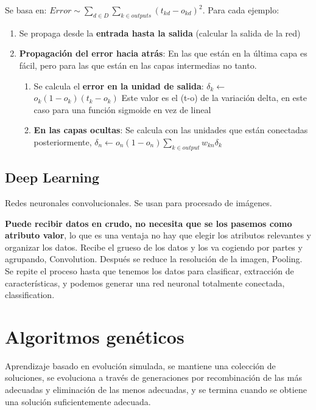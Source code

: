 \documentclass[12pt, twoside, openright]{report} %
\begin{document}
Se basa en:
$Error \sim \sum _{d \in D} \sum_{k \in outputs} (t_{kd}-o_{kd})^2$.
Para cada ejemplo:

\begin{enumerate}
	\def\labelenumi{\arabic{enumi}.}
	\item Se propaga desde la \textbf{entrada hasta la salida} (calcular la salida de la red)
	\pagebreak
	\item \textbf{Propagación del error hacia atrás}: En las que están en la
	      última capa es fácil, pero para las que están en las capas intermedias
	      no tanto.

	      \begin{enumerate}
		      \def\labelenumii{\arabic{enumii}.}
		      \item Se calcula el \textbf{error en la unidad de salida}:
		            \(\delta_k \leftarrow\) \(o_k(1-o_k)(t_k-o_k)\) Este valor es el
		            (t-o) de la variación delta, en este caso para una función sigmoide
		            en vez de lineal
		      \item \textbf{En las capas ocultas}: Se calcula con las unidades que están
		            conectadas posteriormente,
		            \(\delta_n \leftarrow o_n(1-o_n)\sum_{k \in output} w_{kn}\delta_k\)
	      \end{enumerate}
\end{enumerate}

\subsection{Deep Learning}

Redes neuronales convolucionales. Se usan para procesado de imágenes.

\textbf{Puede recibir datos en crudo, no necesita que se los pasemos
	como atributo valor}, lo que es una ventaja no hay que elegir los atributos
relevantes y organizar los datos. Recibe el grueso de los datos y los
va cogiendo por partes y agrupando, Convolution. Después se reduce la
resolución de la imagen, Pooling. Se repite el proceso hasta que tenemos
los datos para clasificar, extracción de características, y podemos
generar una red neuronal totalmente conectada, classification.

\section{Algoritmos genéticos}
\begin{figure}[H]
	{\def\svgwidth{.9\textwidth}
	}
\end{figure}
Aprendizaje basado en evolución simulada, se mantiene una colección de soluciones, se evoluciona a través de generaciones por recombinación de las más adecuadas y eliminación de las menos adecuadas, y se termina cuando se obtiene una solución suficientemente adecuada.
\end{document}
